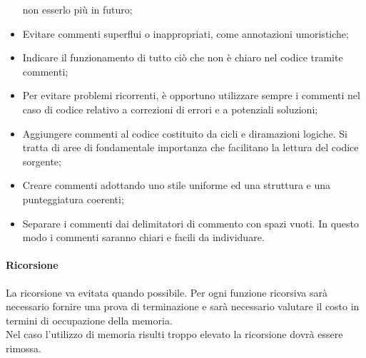 \documentclass[../NormeDiProgetto_v3.0.0.tex]{subfiles}
\begin{document}
\begin{itemize}
                        non esserlo più in futuro;
                        \item Evitare commenti superflui o inappropriati, come annotazioni umoristiche;
                        \item Indicare il funzionamento di tutto ciò che non è chiaro nel codice tramite commenti;
                        \item Per evitare problemi ricorrenti, è opportuno utilizzare sempre i commenti nel caso di codice
                        relativo a correzioni di errori e a potenziali soluzioni;
                        \item Aggiungere commenti al codice costituito da cicli e diramazioni logiche. Si tratta di aree
                        di fondamentale importanza che facilitano la lettura del codice sorgente;
                        \item Creare commenti adottando uno stile uniforme ed una struttura e una punteggiatura coerenti;
                        \item Separare i commenti dai delimitatori di commento con spazi vuoti. In questo modo i
                        commenti saranno chiari e facili da individuare.
                  \end{itemize}

            \paragraph{Ricorsione}
            La ricorsione va evitata quando possibile. Per ogni funzione ricorsiva sarà necessario fornire una prova di terminazione e sarà necessario valutare il costo in termini di occupazione della memoria. \\
            Nel caso l'utilizzo di memoria risulti troppo elevato la ricorsione dovrà essere rimossa.
			
\end{document}
